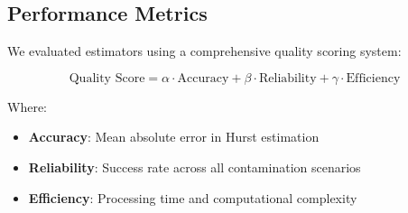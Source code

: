 \subsection{Performance Metrics}

We evaluated estimators using a comprehensive quality scoring system:

\begin{equation}
\text{Quality Score} = \alpha \cdot \text{Accuracy} + \beta \cdot \text{Reliability} + \gamma \cdot \text{Efficiency}
\end{equation}

Where:
\begin{itemize}
    \item \textbf{Accuracy}: Mean absolute error in Hurst estimation
    \item \textbf{Reliability}: Success rate across all contamination scenarios
    \item \textbf{Efficiency}: Processing time and computational complexity
\end{itemize}
